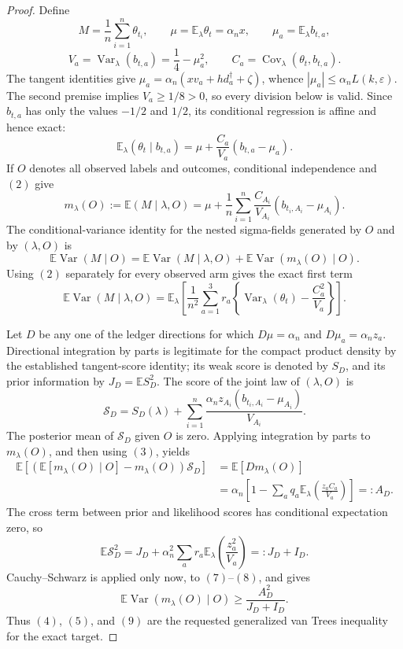 \documentclass{article}
\begin{document}
{\begin{proof}
Define
\[
M=\frac1n\sum_{i=1}^n\theta_{t_i},\qquad
\mu=\mathbb E_\lambda\theta_t=\alpha_nx,\qquad
\mu_a=\mathbb E_\lambda b_{t,a},
\]
\[
V_a=\operatorname{Var}_\lambda(b_{t,a})=\frac14-\mu_a^2,\qquad
C_a=\operatorname{Cov}_\lambda(\theta_t,b_{t,a}).
\tag{1}
\]
The tangent identities give
\(\mu_a=\alpha_n(xv_a+hd_a^\dagger+\zeta)\), whence
\(|\mu_a|\le\alpha_nL(k,\varepsilon)\).  The second premise implies
\(V_a\ge1/8>0\), so every division below is valid.  Since \(b_{t,a}\) has only the values \(-1/2\) and \(1/2\), its conditional regression is affine and hence exact:
\[
\mathbb E_\lambda(\theta_t\mid b_{t,a})
=\mu+\frac{C_a}{V_a}(b_{t,a}-\mu_a).
\tag{2}
\]
If \(O\) denotes all observed labels and outcomes, conditional independence and \((2)\) give
\[
m_\lambda(O):=\mathbb E(M\mid\lambda,O)
=\mu+\frac1n\sum_{i=1}^n
\frac{C_{A_i}}{V_{A_i}}(b_{t_i,A_i}-\mu_{A_i}).
\tag{3}
\]
The conditional-variance identity for the nested sigma-fields generated by \(O\) and by \((\lambda,O)\) is
\[
\mathbb E\operatorname{Var}(M\mid O)
=\mathbb E\operatorname{Var}(M\mid\lambda,O)
+\mathbb E\operatorname{Var}(m_\lambda(O)\mid O).
\tag{4}
\]
Using \((2)\) separately for every observed arm gives the exact first term
\[
\mathbb E\operatorname{Var}(M\mid\lambda,O)
=\mathbb E_\lambda\left[
\frac1{n^2}\sum_{a=1}^3r_a
\left\{\operatorname{Var}_\lambda(\theta_t)-\frac{C_a^2}{V_a}\right\}
\right].
\tag{5}
\]

Let \(D\) be any one of the ledger directions for which
\(D\mu=\alpha_n\) and \(D\mu_a=\alpha_nz_a\).  Directional integration by parts is legitimate for the compact product density by the established tangent-score identity; its weak score is denoted by \(S_D\), and its prior information by \(J_D=\mathbb E S_D^2\).  The score of the joint law of \((\lambda,O)\) is
\[
\mathcal S_D=S_D(\lambda)+
\sum_{i=1}^n
\frac{\alpha_nz_{A_i}(b_{t_i,A_i}-\mu_{A_i})}{V_{A_i}}.
\tag{6}
\]
The posterior mean of \(\mathcal S_D\) given \(O\) is zero.  Applying integration by parts to \(m_\lambda(O)\), and then using \((3)\), yields
\[
\begin{aligned}
\mathbb E[(\mathbb E[m_\lambda(O)\mid O]-m_\lambda(O))\mathcal S_D]
&=\mathbb E[D m_\lambda(O)]\\
&=\alpha_n\left[1-\sum_aq_a
\mathbb E_\lambda\left(\frac{z_aC_a}{V_a}\right)\right]
=:A_D.
\end{aligned}
\tag{7}
\]
The cross term between prior and likelihood scores has conditional expectation zero, so
\[
\mathbb E\mathcal S_D^2
=J_D+\alpha_n^2\sum_ar_a
\mathbb E_\lambda\left(\frac{z_a^2}{V_a}\right)=:J_D+I_D.
\tag{8}
\]
Cauchy--Schwarz is applied only now, to \((7)\)--\((8)\), and gives
\[
\mathbb E\operatorname{Var}(m_\lambda(O)\mid O)
\ge\frac{A_D^2}{J_D+I_D}.
\tag{9}
\]
Thus \((4)\), \((5)\), and \((9)\) are the requested generalized van Trees inequality for the exact target.


\end{proof}}
\end{document}
